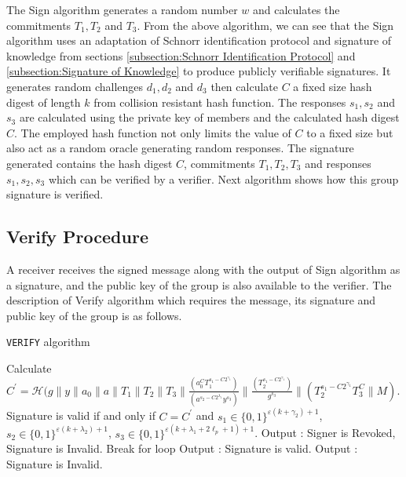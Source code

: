 The Sign algorithm generates a random number $w$ and calculates the commitments $T_1, T_2$ and $T_3$. From the above algorithm, we can see that the Sign algorithm uses an adaptation of Schnorr identification protocol and signature of knowledge from sections \ref{subsection:Schnorr Identification Protocol} and \ref{subsection:Signature of Knowledge} to produce publicly verifiable signatures. It generates random challenges $d_1, d_2$ and $d_3$ then calculate $C$ a fixed size hash digest of length $k$ from collision resistant hash function. The responses $s_1, s_2$ and $s_3$ are calculated using the private key of members and the calculated hash digest $C$. The employed hash function not only limits the value of  $C$ to a fixed size but also act as a random oracle generating random responses. The signature generated contains the hash digest $C$, commitments $T_1, T_2, T_3$ and responses $s_1, s_2, s_3$ which can be verified by a verifier. Next algorithm shows how this group signature is verified.
\subsection{Verify Procedure}
A receiver receives the signed message along with the output of Sign algorithm as a signature, and the public key of the group is also available to the verifier. The description of Verify algorithm which requires the message, its signature and public key of the group is as follows.

\begin{algorithm}
\caption{\texttt{VERIFY} algorithm}
\begin{algorithmic}[1]
\STATE Calculate $C^\prime = \mathcal{H}(g\parallel y\parallel a_0 \parallel a\parallel T_1\parallel T_2\parallel T_3\parallel
\frac{(a_0^C T_1^{s_1-C2^{\gamma_1}})} {(a^{s_2-C2^{\lambda_1}}y^{s_3})}
\parallel \frac{(T_2^{s_1- C2^{\gamma_1}})}{g^{s_3}} 
\parallel (T_2^{s_1-C2^{\gamma_1}}T_3^C
\parallel M) $.
\STATE Signature is valid if and only if $C = C^\prime$ and 
$s_1 \in \{ 0, 1\}^{\varepsilon(k + \gamma_2)+1}$,
$s_2 \in \{ 0, 1\}^{\varepsilon(k + \lambda_2)+1}$,
$s_3 \in \{ 0, 1\}^{\varepsilon(k + \lambda_1+2\ell_p + 1)+1}$.
			\STATE Output : Signer is Revoked, Signature is Invalid.
			\STATE Break for loop
		\ENDIF
	\ENDFOR
	\STATE Output : Signature is valid.
\ELSE
	\STATE Output : Signature is Invalid.
\ENDIF
\end{algorithmic}
\end{algorithm}

